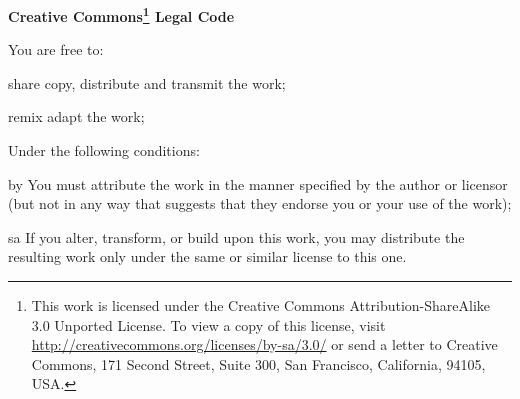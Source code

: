 \begin{center} 
  \textbf{\LARGE{Creative Commons\footnote{ This work is licensed
        under the Creative Commons Attribution-ShareAlike 3.0 Unported
        License. To view a copy of this license, visit
        \url{http://creativecommons.org/licenses/by-sa/3.0/} or send a
        letter to Creative Commons, 171 Second Street, Suite 300, San
        Francisco, California, 94105, USA.} Legal Code} }
\end{center}
\vspace{1cm}

\begin{lblock}{You are free to:}

  \begin{pictonote}{share}
     copy, distribute and transmit the work;
  \end{pictonote}

  \begin{pictonote}{remix}
     adapt the work;
  \end{pictonote}

\end{lblock}
\begin{lblock}{Under the following conditions:}
  
  \begin{pictonote}{by}
     You must attribute the work in the manner
    specified by the author or licensor (but not in any way that
    suggests that they endorse you or your use of the work);
  \end{pictonote}
  
  \begin{pictonote}{sa}
     If you alter, transform, or build upon
    this work, you may distribute the resulting work only under the
    same or similar license to this one.
  \end{pictonote}
  
\end{lblock}
